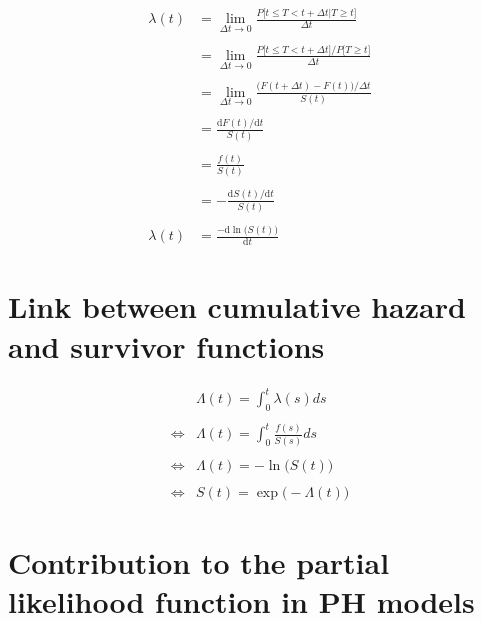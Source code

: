 \documentclass[
]{book}
\begin{document}
\begin{equation}    
  \begin{aligned}
  \lambda(t) & = \lim_{\Delta t \to 0} \frac{P\big[t \leq T < t + \Delta t | T \geq t \big]}{\Delta t} \\\\
  & = \lim_{\Delta t \to 0} \frac{P\big[t \leq T < t + \Delta t \big] / P\big[T \geq t  \big]}{\Delta t} \\\\
  & = \lim_{\Delta t \to 0} \frac{\big(F(t+\Delta t)-F(t)\big) / \Delta t}{S(t)} \\\\
  & = \frac{\text{d} F(t) / \text{d} t}{S(t)} \\\\
  & = \frac{f(t)}{S(t)} \\\\
  & = - \frac{\text{d}S(t) / \text{d} t}{S(t)} \\\\
  \lambda(t) & = \frac{-\text{d} \ln \big(S(t)\big)}{\text{d} t}
  \end{aligned}
  \label{eq:hazfunproof}
\end{equation}

\hypertarget{link-between-cumulative-hazard-and-survivor-functions}{%
\section*{Link between cumulative hazard and survivor functions}\label{link-between-cumulative-hazard-and-survivor-functions}}

\begin{equation}
  \begin{aligned}
       & \Lambda(t) = \int_{0}^{t} \lambda(s)ds \\\\
  \iff & \Lambda(t) = \int_{0}^{t} \frac{f(s)}{S(s)}ds \\\\
  \iff & \Lambda(t) = -\ln \big(S(t)\big) \\\\
  \iff & S(t) = \exp \big(-\Lambda(t)\big)
  \end{aligned}
  \label{eq:linksurvcumhaz}
\end{equation}

\hypertarget{contribution-to-the-partial-likelihood-function-in-ph-models}{%
\section*{Contribution to the partial likelihood function in PH models}\label{contribution-to-the-partial-likelihood-function-in-ph-models}}
\end{document}
